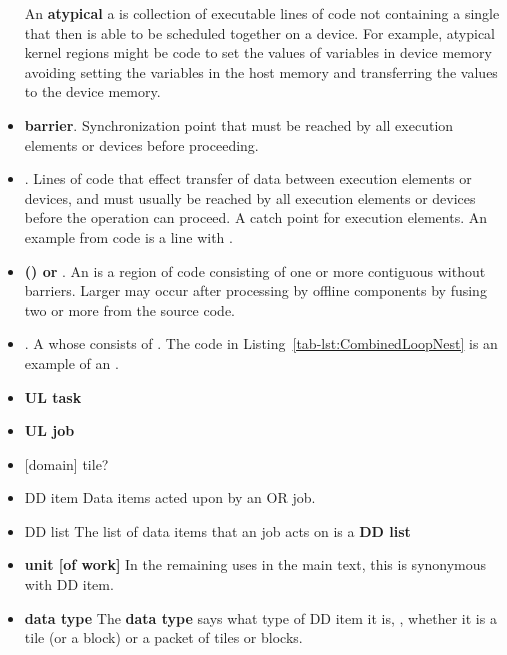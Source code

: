 \documentclass{article}
\begin{document}
\begin{itemize}
An \textbf{atypical} \ULKR a is collection of executable
lines of code not containing a single \cellloopnest that then is able to be scheduled together on a device.
For
example, atypical kernel regions might be code to set the values of variables in
device memory avoiding setting the variables in the host memory and transferring the values to the device
memory.

\item \textbf{barrier}. Synchronization point that
must be reached by all execution elements or devices before proceeding.

\item \textbf{\spelledoutDM}.  Lines of code that effect transfer
of data between execution elements or devices, and must usually be
reached by all execution elements or devices before the operation can
proceed. A catch point for execution elements.  An example from \FlashOfTheFuture code is a line with .


\item \textbf{\OLAR (\spelledoutOLAR) or \ULtaskreg}. An \OLAR is a region of code consisting of one or more
contiguous  \ULKRs without barriers. Larger \OLARs may occur after processing by offline components
by fusing two or more \OLARs from the source code.

\item \textbf{\actionnest}.
A \tileloopnest whose \tileloopbody consists of \OLARs.
The code in Listing~\ref{tab-lst:CombinedLoopNest} is an example of an \actionnest.

\item \textbf{UL task} 
\item \textbf{UL job} 
\item {[}domain{]} tile? 
\item {DD item} Data items acted upon by an OR job.
\item {DD list} The list of data items that an \shortOR job acts on is a \textbf{DD list}
\item \textbf{unit [of work]} In the remaining uses in the main text, this is synonymous with
      DD item.
\item \textbf{data type} The \textbf{data type} says
      what type of DD item it is, \ie, whether it is a tile (or a block)
      or a packet of tiles or blocks.

\end{itemize}
\end{document}
